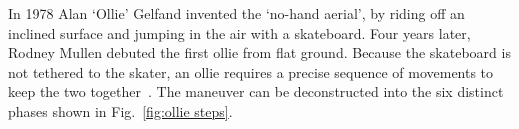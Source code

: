 \documentclass[default,iicol]{sn-jnl}
\begin{document}
In 1978 Alan `Ollie' Gelfand invented the `no-hand aerial', by riding off an inclined surface and jumping in the air with a skateboard.
Four years later, Rodney Mullen debuted the first ollie from flat ground.
Because the skateboard is not tethered to the skater, an ollie requires a precise sequence of movements to keep the two together~\cite{frederick_biomechanics_2006}.
The maneuver can be deconstructed into the six
distinct phases shown in Fig.~\ref{fig:ollie steps}.

\begin{figure}[!t]
\captionsetup[subfigure]{labelformat=empty}

\end{figure}
\end{document}
